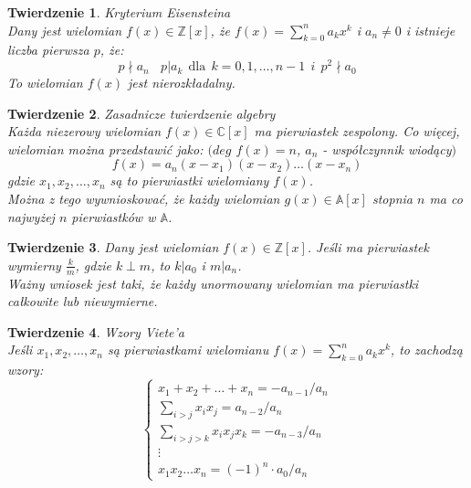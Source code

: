 \documentclass[10pt,a4paper]{article}
\theoremstyle{plain}
\newtheorem{thm}{Twierdzenie}[section]
\theoremstyle{definition}
\theoremstyle{remark}
\newcommand{\Z}{\mathbb{Z}}
\newcommand{\C}{\mathbb{C}}
\newcommand{\A}{\mathbb{A}}
\begin{document}
	\begin{thm}{Kryterium Eisensteina}
		\\
		Dany jest wielomian $f(x) \in \Z[x]$, że $f(x)=\sum_{k=0}^n a_kx^k$ i $a_n \neq 0$ i istnieje liczba pierwsza $p$, że: 
		$$p \nmid a_n ~~~~ p|a_k ~~ \text{dla} ~~ k=0,1,\ldots,n-1 ~~ i ~~ p^2 \nmid a_0$$
		To wielomian $f(x)$ jest nierozkładalny.
	\end{thm}
	\begin{thm}{Zasadnicze twierdzenie algebry}
		\\
		Każda niezerowy wielomian $f(x) \in \C[x]$ ma pierwiastek zespolony. Co więcej, wielomian można przedstawić jako: $(deg$ $f(x)=n$, $a_n$ - współczynnik wiodący$)$
		$$f(x)=a_n(x-x_1)(x-x_2)\ldots(x-x_n)$$
		gdzie $x_1,x_2,\ldots,x_n$ są to pierwiastki wielomiany $f(x)$. 
		\\ Można z tego wywnioskować, że każdy wielomian $g(x) \in \A[x]$ stopnia $n$ ma co najwyżej $n$ pierwiastków w $\A$.
	\end{thm}
	\begin{thm}
		Dany jest wielomian $f(x) \in \Z[x]$. Jeśli ma pierwiastek wymierny $\frac{k}{m}$, gdzie $k \perp m$, to $k|a_0$ i $m|a_n$. 
		\\ Ważny wniosek jest taki, że każdy unormowany wielomian ma pierwiastki całkowite lub niewymierne.
	\end{thm}
	\begin{thm}{Wzory Viete'a}
		\\
		Jeśli $x_1,x_2,\ldots,x_n$ są pierwiastkami wielomianu $f(x) = \sum_{k=0}^{n}a_kx^k$, to zachodzą wzory:
		$$
		\left\{ \begin{array}{ll}
		x_1+x_2+\ldots+x_n=-{a_{n-1}}/{a_n} \\
		\sum_{i>j}x_ix_j=a_{n-2}/a_n \\
		\sum_{i>j>k}x_ix_jx_k=-a_{n-3}/a_n\\
		\vdots \\
		x_1x_2\ldots x_n=(-1)^n \cdot a_0/a_n
		\end{array} \right.	
		$$
	\end{thm}
	
\end{document}
